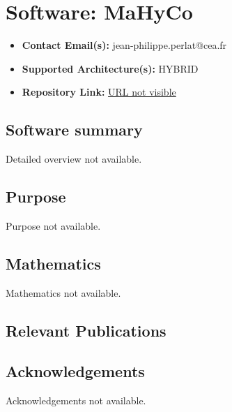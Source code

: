 \section{Software: MaHyCo}
\label{sec:MaHyCo:software}



\begin{itemize}
    \item \textbf{Contact Email(s):} jean-philippe.perlat@cea.fr
    \item \textbf{Supported Architecture(s):} HYBRID
    \item \textbf{Repository Link:} \href{URL not visible}{URL not visible}
\end{itemize}

\subsection{Software summary}
\label{sec:MaHyCo:summary}
Detailed overview not available.



\subsection{Purpose}
\label{sec:MaHyCo:purpose}
Purpose not available.



\subsection{Mathematics}
\label{sec:MaHyCo:mathematics}
Mathematics not available.


\subsection{Relevant Publications}
\label{sec:MaHyCo:publications}

\subsection{Acknowledgements}
\label{sec::MaHyCo:acknowledgements}

Acknowledgements not available.


